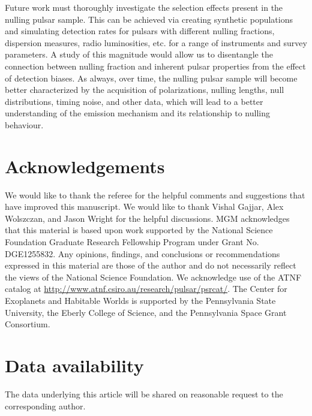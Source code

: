 \documentclass[fleqn,usenatbib]{mnras}
\begin{document}
Future work must thoroughly investigate the selection effects present in the nulling pulsar sample. This can be achieved via creating synthetic populations and simulating detection rates for pulsars with different nulling fractions, dispersion measures, radio luminosities, etc. for a range of instruments and survey parameters. A study of this magnitude would allow us to disentangle the connection between nulling fraction and inherent pulsar properties from the effect of detection biases. As always, over time, the nulling pulsar sample will become better characterized by the acquisition of polarizations, nulling lengths, null distributions, timing noise, and other data, which will lead to a better understanding of the emission mechanism and its relationship to nulling behaviour.

\section*{Acknowledgements}

We would like to thank the referee for the helpful comments and suggestions that have improved this manuscript. We would like to thank Vishal Gajjar, Alex Wolszczan, and Jason Wright for the helpful discussions. MGM acknowledges that this material is based upon work supported by the National Science Foundation Graduate Research Fellowship Program under Grant No. DGE1255832. Any opinions, findings, and conclusions or recommendations expressed in this material are those of the author and do not necessarily reflect the views of the National Science Foundation. We acknowledge use of the ATNF catalog at \url{http://www.atnf.csiro.au/research/pulsar/psrcat/}. The Center for Exoplanets and Habitable Worlds is supported by the Pennsylvania State University, the Eberly College of Science, and the Pennsylvania Space Grant Consortium.

\section*{Data availability}
The data underlying this article will be shared on reasonable request to the corresponding author.







\bsp	%
\label{lastpage}
\end{document}

